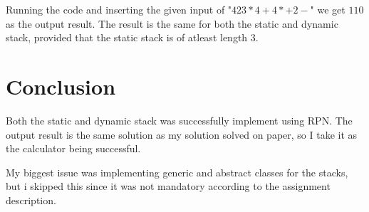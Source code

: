 \documentclass[a4paper,11pt]{article}
\begin{document}
Running the code and inserting the given input of 
"$ 4 2 3 * 4 + 4 * + 2 -$" we get $ 110$ as the output result. The
result is the same for both the static and dynamic stack, provided
that the static stack is of atleast length 3. 

\section*{Conclusion}

Both the static and dynamic stack was successfully implement using
RPN. The output result is the same solution as my solution solved
on paper, so I take it as the calculator being successful. 

My biggest issue was implementing generic and abstract classes
for the stacks, but i skipped this since it was not mandatory 
according to the assignment description.
\end{document}
